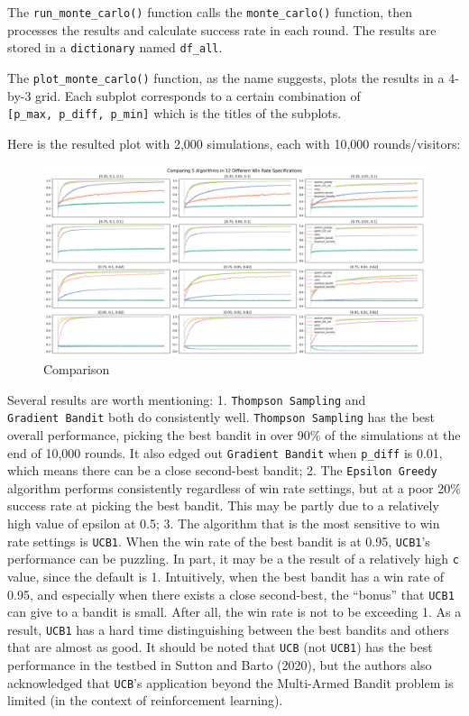 \documentclass[
]{book}
\theoremstyle{definition}
\theoremstyle{definition}
\theoremstyle{definition}
\theoremstyle{definition}
\theoremstyle{remark}
\begin{document}
The \texttt{run\_monte\_carlo()} function calls the \texttt{monte\_carlo()} function, then processes the results and calculate success rate in each round. The results are stored in a \texttt{dictionary} named \texttt{df\_all}.

The \texttt{plot\_monte\_carlo()} function, as the name suggests, plots the results in a 4-by-3 grid. Each subplot corresponds to a certain combination of \texttt{{[}p\_max,\ p\_diff,\ p\_min{]}} which is the titles of the subplots.

Here is the resulted plot with 2,000 simulations, each with 10,000 rounds/visitors:

\begin{figure}
\centering
\includegraphics{images/comparison.png}
\caption{Comparison}
\end{figure}

Several results are worth mentioning:
1. \texttt{Thompson\ Sampling} and \texttt{Gradient\ Bandit} both do consistently well. \texttt{Thompson\ Sampling} has the best overall performance, picking the best bandit in over 90\% of the simulations at the end of 10,000 rounds. It also edged out \texttt{Gradient\ Bandit} when \texttt{p\_diff} is 0.01, which means there can be a close second-best bandit;
2. The \texttt{Epsilon\ Greedy} algorithm performs consistently regardless of win rate settings, but at a poor 20\% success rate at picking the best bandit. This may be partly due to a relatively high value of epsilon at 0.5;
3. The algorithm that is the most sensitive to win rate settings is \texttt{UCB1}. When the win rate of the best bandit is at 0.95, \texttt{UCB1}'s performance can be puzzling. In part, it may be a the result of a relatively high \texttt{c} value, since the default is 1. Intuitively, when the best bandit has a win rate of 0.95, and especially when there exists a close second-best, the ``bonus'' that \texttt{UCB1} can give to a bandit is small. After all, the win rate is not to be exceeding 1. As a result, \texttt{UCB1} has a hard time distinguishing between the best bandits and others that are almost as good. It should be noted that \texttt{UCB} (not \texttt{UCB1}) has the best performance in the testbed in Sutton and Barto (2020), but the authors also acknowledged that \texttt{UCB}'s application beyond the Multi-Armed Bandit problem is limited (in the context of reinforcement learning).
\end{document}
